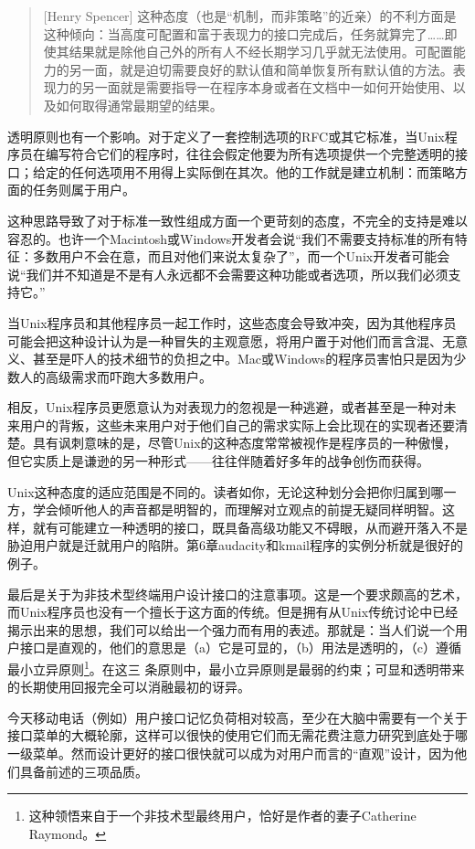 \documentclass[12pt,oneside]{ctexbook}
\begin{document}
\begin{common-format}
\begin{quote}[Henry Spencer]
这种态度（也是“机制，而非策略”的近亲）的不利方面是这种倾向：当高度可配置和富于表现力的接口完成后，任务就算完了……即使其结果就是除他自己外的所有人不经长期学习几乎就无法使用。可配置能力的另一面，就是迫切需要良好的默认值和简单恢复所有默认值的方法。表现力的另一面就是需要指导一在程序本身或者在文档中一如何开始使用、以及如何取得通常最期望的结果。
\end{quote}

透明原则也有一个影响。对于定义了一套控制选项的RFC或其它标准，当Unix程序员在编写符合它们的程序时，往往会假定他要为所有选项提供一个完整透明的接口；给定的任何选项用不用得上实际倒在其次。他的工作就是建立机制：而策略方面的任务则属于用户。

这种思路导致了对于标准一致性组成方面一个更苛刻的态度，不完全的支持是难以容忍的。也许一个Macintosh或Windows开发者会说“我们不需要支持标准的所有特征：多数用户不会在意，而且对他们来说太复杂了”，而一个Unix开发者可能会说“我们并不知道是不是有人永远都不会需要这种功能或者选项，所以我们必须支持它。”

当Unix程序员和其他程序员一起工作时，这些态度会导致冲突，因为其他程序员可能会把这种设计认为是一种冒失的主观意愿，将用户置于对他们而言含混、无意义、甚至是吓人的技术细节的负担之中。Mac或Windows的程序员害怕只是因为少数人的高级需求而吓跑大多数用户。

相反，Unix程序员更愿意认为对表现力的忽视是一种逃避，或者甚至是一种对未来用户的背叛，这些未来用户对于他们自己的需求实际上会比现在的实现者还要清楚。具有讽刺意味的是，尽管Unix的这种态度常常被视作是程序员的一种傲慢，但它实质上是谦逊的另一种形式——往往伴随着好多年的战争创伤而获得。

Unix这种态度的适应范围是不同的。读者如你，无论这种划分会把你归属到哪一方，学会倾听他人的声音都是明智的，而理解对立观点的前提无疑同样明智。这样，就有可能建立一种透明的接口，既具备高级功能又不碍眼，从而避开落入不是胁迫用户就是迁就用户的陷阱。第6章audacity和kmail程序的实例分析就是很好的例子。

最后是关于为非技术型终端用户设计接口的注意事项。这是一个要求颇高的艺术，而Unix程序员也没有一个擅长于这方面的传统。但是拥有从Unix传统讨论中已经揭示出来的思想，我们可以给出一个强力而有用的表述。那就是：当人们说一个用户接口是直观的，他们的意思是（a）它是可显的，（b）用法是透明的，（c）遵循最小立异原则\footnote{这种领悟来自于一个非技术型最终用户，恰好是作者的妻子Catherine Raymond。}。在这三
条原则中，最小立异原则是最弱的约束；可显和透明带来的长期使用回报完全可以消融最初的讶异。

今天移动电话（例如）用户接口记忆负荷相对较高，至少在大脑中需要有一个关于接口菜单的大概轮廓，这样可以很快的使用它们而无需花费注意力研究到底处于哪一级菜单。然而设计更好的接口很快就可以成为对用户而言的“直观”设计，因为他们具备前述的三项品质。


\end{common-format}
\end{document}
